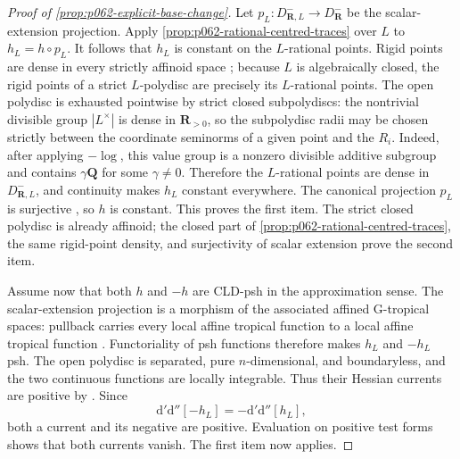 \begin{proof}[Proof of \cref{prop:p062-explicit-base-change}]
Let \(p_L:D^-_{\mathbf R,L}\to D^-_{\mathbf R}\) be the scalar-extension
projection.  Apply \cref{prop:p062-rational-centred-traces} over \(L\) to
\(h_L=h\circ p_L\).  It follows that \(h_L\) is constant on the
\(L\)-rational points.  Rigid points are dense in every strictly affinoid
space \cite[Proposition~2.1.15]{Berk12}; because \(L\) is algebraically
closed, the rigid points of a strict \(L\)-polydisc are precisely its
\(L\)-rational points.  The open polydisc is exhausted pointwise by strict
closed subpolydiscs: the nontrivial divisible group
\(|L^\times|\) is dense in \(\mathbf R_{>0}\), so the subpolydisc radii
may be chosen strictly between the coordinate seminorms of a given point
and the \(R_i\).  Indeed, after applying \(-\log\), this value group is
a nonzero divisible additive subgroup and contains
\(\gamma\mathbf Q\) for some \(\gamma\ne0\).  Therefore the
\(L\)-rational points are dense in
\(D^-_{\mathbf R,L}\), and continuity makes \(h_L\) constant everywhere.
The canonical projection \(p_L\) is surjective
\cite[\S11.1.9]{CLD25}, so \(h\) is constant.
This proves the first item.  The strict closed polydisc is already
affinoid; the closed part of \cref{prop:p062-rational-centred-traces},
the same rigid-point density, and surjectivity of scalar extension prove
the second item.

Assume now that both \(h\) and \(-h\) are CLD-psh in the approximation
sense.  The scalar-extension projection is a morphism of the associated
affined G-tropical spaces: pullback carries every local affine tropical
function to a local affine tropical function
\cite[\S\S12.4.5--12.4.6]{CLD25}.  Functoriality of psh
functions \cite[Proposition~8.1.5]{CLD25} therefore makes \(h_L\) and
\(-h_L\) psh.  The open polydisc is separated, pure \(n\)-dimensional,
and boundaryless, and the two continuous functions are locally
integrable.  Thus their Hessian currents are positive by
\cite[Proposition~8.3.1(a)]{CLD25}.  Since
\[
             \mathrm d'\mathrm d''[-h_L]
                 =-\mathrm d'\mathrm d''[h_L],
\]
both a current and its negative are positive.  Evaluation on positive
test forms shows that both currents vanish.  The first item now applies.
\end{proof}
